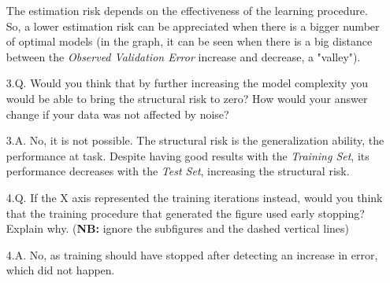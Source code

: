 \documentclass[11pt]{scrartcl}
\begin{document}
\begin{itemize}
        The estimation risk depends on the effectiveness of the learning procedure. So, a lower estimation risk can be appreciated when there is a bigger number of optimal models (in the graph, it can be seen when there is a big distance between the \textit{Observed Validation Error} increase and decrease, a "valley").\\
        \item[3.Q.] Would you think that by further increasing the model complexity you would be able to bring the structural risk to zero? How would your answer change if your data was not affected by noise?
        \item[3.A.] No, it is not possible. The structural risk is the generalization ability, the performance at task. Despite having good results with the \textit{Training Set}, its performance decreases with the \textit{Test Set}, increasing the structural risk.\\
        \item[4.Q.] If the X axis represented the training iterations instead, would you think that the training procedure that generated the figure used early stopping? Explain why. (\textbf{NB:} ignore the subfigures and the dashed vertical lines)
        \item[4.A.] No, as training should have stopped after detecting an increase in error, which did not happen.\\
    \end{itemize}
\end{document}
